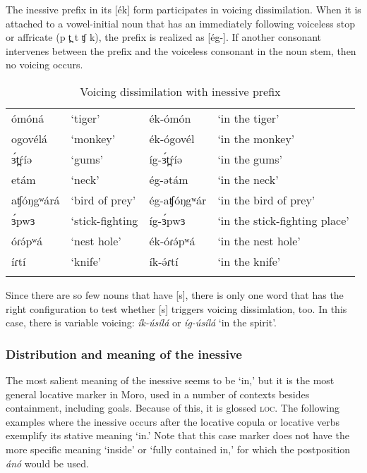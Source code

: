 The inessive prefix in its [ék] form participates in voicing dissimilation. When it is attached to a vowel-initial noun that has an immediately following voiceless stop or affricate (p t̪  t ʧ k), the prefix is realized as [ég-]. If another consonant intervenes between the prefix and the voiceless consonant in the noun stem, then no voicing occurs.

\begin{table}
	\caption{Voicing dissimilation with inessive prefix}
	\begin{tabular}[t]{llll}
\lsptoprule
			ómóná	& 	‘tiger’	&	ék-ómón		&‘in the tiger’\\
			ogovélá	&	‘monkey’	&	ék-ógovél	&‘in the monkey’\\
\midrule 
			ɜ́t̪ŕíə		&	‘gums’	&	íg-ɜ́t̪ŕíə	&	‘in the gums’	\\
 			etám		&	‘neck’	&	ég-ətám		&	‘in the neck’\\
			aʧóŋgʷárá	&‘bird of prey’	&	ég-aʧóŋgʷár	& ‘in the bird of prey’	\\
			ɜ́pwɜ		&	‘stick-fighting	&	íg-ɜ́pwɜ	&	‘in the stick-fighting place’	\\
\midrule
			óɾə́pʷá	&‘nest hole’	&	ék-óɾə́pʷá	&‘in the nest hole’\\
			íɾtí	&‘knife’		&	ík-ə́ɾtí		&‘in the knife’\\
			\lspbottomrule
	\end{tabular}
\end{table}

Since there are so few nouns that have [s], there is only one word that has the right configuration to test whether [s] triggers voicing dissimlation, too. In this case, there is variable voicing: \textit{ík-úsílá} or \textit{íg-úsílá} ‘in the spirit’.    

\subsubsection{Distribution and meaning of the inessive}

The most salient meaning of the inessive seems to be `in,' but it is the most general locative marker in Moro, used in a number of contexts besides containment, including goals. Because of this, it is glossed \textsc{loc}. The following examples where the inessive occurs after the locative copula or locative verbs exemplify its stative meaning `in.' Note that this case marker does not have the more specific meaning `inside' or `fully contained in,' for which the postposition \textit{ánó} would be used.

